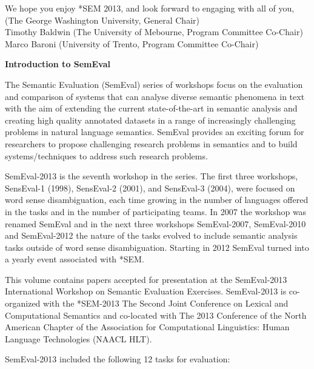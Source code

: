We hope you enjoy *SEM 2013, and look forward to engaging with all of you, \\[2ex]



 (The George Washington University, General Chair)\\
Timothy Baldwin (The University of Mebourne, Program Committee Co-Chair)\\
Marco Baroni (University of Trento, Program Committee Co-Chair)\\


\newpage

\begin{center}
  {\Large \bf Introduction to SemEval}
\end{center}


The Semantic Evaluation (SemEval) series of workshops focus on the evaluation and comparison of systems that can analyse diverse semantic phenomena in text with the aim of extending the current state-of-the-art in semantic analysis and creating high quality annotated datasets in a range of increasingly challenging problems in natural language semantics.  SemEval provides an exciting forum for researchers to propose challenging research problems in semantics and to build systems/techniques to address such research problems.

SemEval-2013 is the seventh workshop in the series.  The first three workshops, SensEval-1 (1998), SensEval-2 (2001), and SensEval-3 (2004), were focused on word sense disambiguation, each time growing in the number of languages offered in the tasks and in the number of participating teams. In 2007 the workshop was renamed SemEval and in the next three workshops SemEval-2007, SemEval-2010 and SemEval-2012 the nature of the tasks evolved to include semantic analysis tasks outside of word sense disambiguation.  Starting in 2012 SemEval turned into a yearly event associated with *SEM.

This volume contains papers accepted for presentation at the SemEval-2013 International Workshop on Semantic Evaluation Exercises. SemEval-2013 is co-organized with the *SEM-2013 The Second Joint Conference on Lexical and Computational Semantics and co-located with The 2013 Conference of the North American Chapter of the Association for Computational Linguistics: Human Language Technologies (NAACL HLT).

SemEval-2013 included the following 12 tasks for evaluation:

